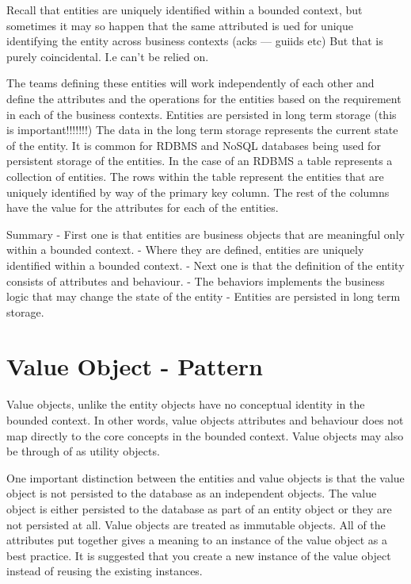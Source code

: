 \documentclass[a4paper, 11pt]{book}
\begin{document}
    Recall that entities are uniquely identified within a bounded context, but sometimes it may so happen that the same attributed is ued for unique identifying the entity across business contexts (acks --- guiids etc)
    But that is purely coincidental. I.e can't be relied on.

    The teams defining these entities will work independently of each other and define the attributes and the operations for the entities based on the requirement in each of the business contexts.
    Entities are persisted in long term storage (this is important!!!!!!!)
    The data in the long term storage represents the current state of the entity.
    It is common for RDBMS and NoSQL databases being used for persistent storage of the entities.
    In the case of an RDBMS a table represents a collection of entities.
    The rows within the table represent the entities that are uniquely identified by way of the primary key column.
    The rest of the columns have the value for the attributes for each of the entities.

    Summary
    - First one is that entities are business objects that are meaningful only within a bounded context.
    - Where they are defined, entities are uniquely identified within a bounded context.
    - Next one is that the definition of the entity consists of attributes and behaviour.
    - The behaviors implements the business logic that may change the state of the entity
    - Entities are persisted in long term storage.


    \section{Value Object - Pattern}

    Value objects, unlike the entity objects have no conceptual identity in the bounded context.
    In other words, value objects attributes and behaviour does not map directly to the core concepts in the bounded context.
    Value objects may also be through of as utility objects. %

    One important distinction between the entities and value objects is that the value object is not persisted to the database as an independent objects.
    The value object is either persisted to the database as part of an entity object or they are not persisted at all.
    Value objects are treated as immutable objects.
    All of the attributes put together gives a meaning to an instance of the value object as a best practice.
    It is suggested that you create a new instance of the value object instead of reusing the existing instances.
\end{document}
